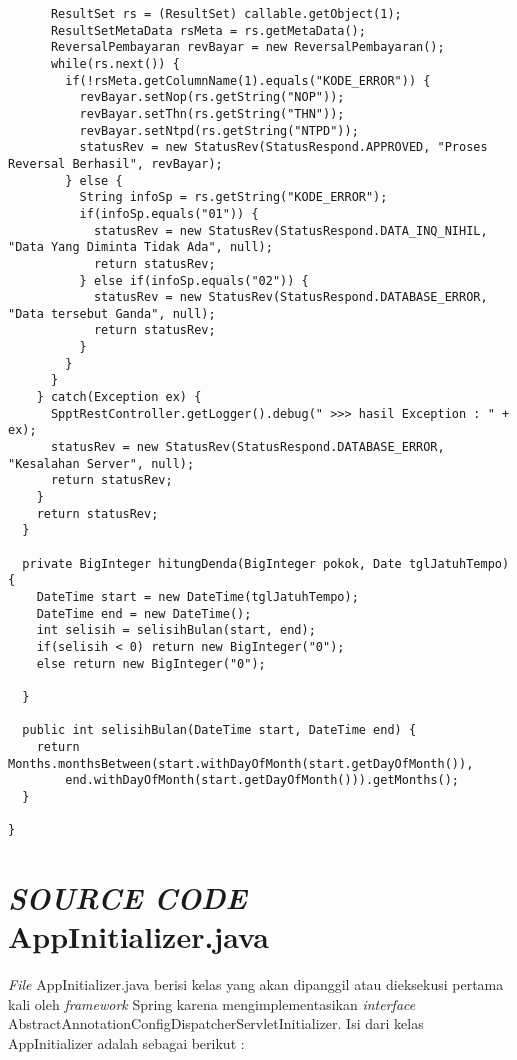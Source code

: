 \documentclass[pdftex,12pt, oneside]{article}
\begin{document}
\begin{lstlisting}
      ResultSet rs = (ResultSet) callable.getObject(1);
      ResultSetMetaData rsMeta = rs.getMetaData();
      ReversalPembayaran revBayar = new ReversalPembayaran();
      while(rs.next()) {
        if(!rsMeta.getColumnName(1).equals("KODE_ERROR")) {
          revBayar.setNop(rs.getString("NOP"));
          revBayar.setThn(rs.getString("THN"));
          revBayar.setNtpd(rs.getString("NTPD"));
          statusRev = new StatusRev(StatusRespond.APPROVED, "Proses Reversal Berhasil", revBayar);
        } else {
          String infoSp = rs.getString("KODE_ERROR");
          if(infoSp.equals("01")) {
            statusRev = new StatusRev(StatusRespond.DATA_INQ_NIHIL, "Data Yang Diminta Tidak Ada", null);
            return statusRev;
          } else if(infoSp.equals("02")) {
            statusRev = new StatusRev(StatusRespond.DATABASE_ERROR, "Data tersebut Ganda", null);
            return statusRev;
          }
        }
      }
    } catch(Exception ex) {
      SpptRestController.getLogger().debug(" >>> hasil Exception : " + ex);
      statusRev = new StatusRev(StatusRespond.DATABASE_ERROR, "Kesalahan Server", null);
      return statusRev;
    }
    return statusRev;
  }

  private BigInteger hitungDenda(BigInteger pokok, Date tglJatuhTempo) {
    DateTime start = new DateTime(tglJatuhTempo);
    DateTime end = new DateTime();
    int selisih = selisihBulan(start, end);
    if(selisih < 0) return new BigInteger("0");
    else return new BigInteger("0");

  }

  public int selisihBulan(DateTime start, DateTime end) {
    return Months.monthsBetween(start.withDayOfMonth(start.getDayOfMonth()),
        end.withDayOfMonth(start.getDayOfMonth())).getMonths();
  }

}
\end{lstlisting}


\section{\textit{SOURCE CODE} AppInitializer.java}

\textit{File} AppInitializer.java berisi kelas yang akan dipanggil atau dieksekusi pertama kali oleh \textit{framework} Spring karena mengimplementasikan \textit{interface} AbstractAnnotationConfigDispatcherServletInitializer. Isi dari kelas AppInitializer adalah sebagai berikut :
\end{document}
